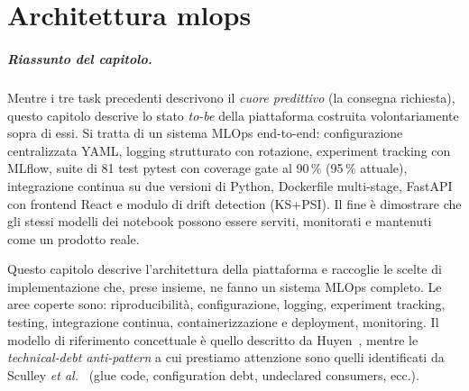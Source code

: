 \chapter{Architettura \texorpdfstring{\acrshort{mlops}}{MLOps}}
\label{chap:mlops}

\paragraph{Riassunto del capitolo.} Mentre i tre task precedenti
descrivono il \emph{cuore predittivo} (la consegna richiesta), questo
capitolo descrive lo stato \emph{to-be} della piattaforma costruita
volontariamente sopra di essi. Si tratta di un sistema MLOps
end-to-end: configurazione centralizzata YAML, logging strutturato con
rotazione, experiment tracking con MLflow, suite di 81 test pytest con
coverage gate al 90\,\% (95\,\% attuale), integrazione continua su due versioni di Python,
Dockerfile multi-stage, FastAPI con frontend React e modulo di drift
detection (KS+PSI). Il fine è dimostrare che gli stessi modelli dei
notebook possono essere serviti, monitorati e mantenuti come un
prodotto reale.

Questo capitolo descrive
l'architettura della piattaforma e raccoglie le scelte di
implementazione che, prese insieme, ne fanno un sistema MLOps completo.
Le aree coperte sono: riproducibilità, configurazione, logging,
experiment tracking, testing, integrazione continua, containerizzazione
e deployment, monitoring. Il modello di riferimento concettuale è
quello descritto da Huyen~\cite{huyen2022designing}, mentre le
\emph{technical-debt anti-pattern} a cui prestiamo attenzione sono
quelli identificati da Sculley \emph{et al.}~\cite{sculley2015hidden}
(glue code, configuration debt, undeclared consumers, ecc.).

